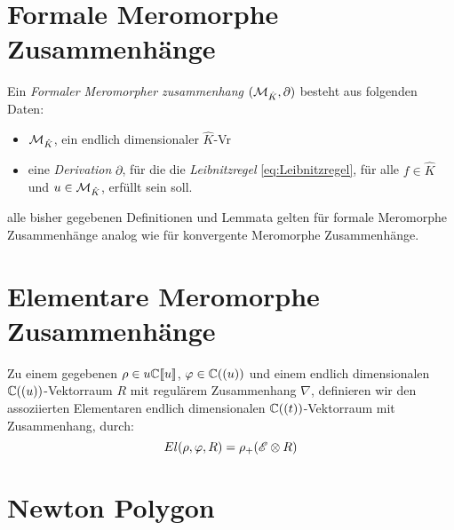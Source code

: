 \section{Formale Meromorphe Zusammenhänge}

\begin{defn}
  Ein \emph{Formaler Meromorpher zusammenhang} $(\mathcal{M}_{\hat{K}},\partial)$ besteht aus 
  folgenden Daten:
  \begin{itemize}
    \item $\mathcal{M}_{\hat{K}}$, ein endlich dimensionaler $\hat K$-Vr
    \item eine \emph{Derivation} $\partial$, für die die \emph{Leibnitzregel} 
      \eqref{eq:Leibnitzregel}, für alle $f\in \hat K$ und $u\in \mathcal{M}_{\hat K}$,
      erfüllt sein soll.
  \end{itemize}
\end{defn}

\begin{comment}
  Oder einfach ein Meromorpher Zshg. über anderes $K$ also $\hat K$
\end{comment}

\begin{bem}
  alle bisher gegebenen Definitionen und Lemmata gelten für formale Meromorphe
  Zusammenhänge analog wie für konvergente Meromorphe Zusammenhänge.
\end{bem}

\section{Elementare Meromorphe Zusammenhänge}

\begin{defn}
  Zu einem gegebenen $\rho\in u\mathbb{C}\llbracket u\rrbracket$, $\varphi\in\mathbb{C}((u))$ und
  einem endlich dimensionalen $\mathbb{C}((u))$-Vektorraum $R$ mit regulärem 
  Zusammenhang $\nabla$, definieren wir den assoziierten Elementaren endlich
  dimensionalen $\mathbb{C}((t))$-Vektorraum mit Zusammenhang, durch:
  \[
    El(\rho,\varphi,R)=\rho_+(\mathscr{E}\otimes R)
  \]
\end{defn}


\section{Newton Polygon} %

